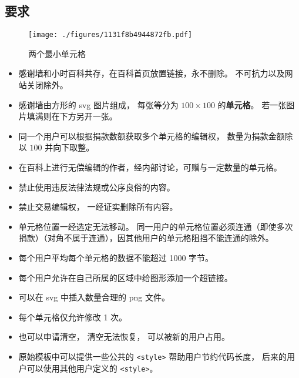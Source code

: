 
\subsection{要求}

\begin{figure}[ht]
\centering
\texttt{[image: ./figures/1131f8b4944872fb.pdf]}
\caption{两个最小单元格} \label{fig_thanks_1}
\end{figure}

\begin{itemize}
\item 感谢墙和小时百科共存，在百科首页放置链接，永不删除。 不可抗力以及网站关闭除外。
\item 感谢墙由方形的 svg 图片组成， 每张等分为 $100\times 100$ 的\textbf{单元格}。 若一张图片填满则在下方另开一张。
\item 同一个用户可以根据捐款数额获取多个单元格的编辑权， 数量为捐款金额除以 $100$ 并向下取整。
\item 在百科上进行无偿编辑的作者，经内部讨论，可赠与一定数量的单元格。
\item 禁止使用违反法律法规或公序良俗的内容。
\item 禁止交易编辑权， 一经证实删除所有内容。
\item 单元格位置一经选定无法移动。 同一用户的单元格位置必须连通（即使多次捐款）（对角不属于连通），因其他用户的单元格阻挡不能连通的除外。
\item 每个用户平均每个单元格的数据不能超过 1000 字节。
\item 每个用户允许在自己所属的区域中给图形添加一个超链接。
\item 可以在 svg 中插入数量合理的 png 文件。
\item 每个单元格仅允许修改 1 次。
\item 也可以申请清空， 清空无法恢复， 可以被新的用户占用。
\item 原始模板中可以提供一些公共的 \verb`<style>` 帮助用户节约代码长度， 后来的用户可以使用其他用户定义的 \verb`<style>`。
\end{itemize}

